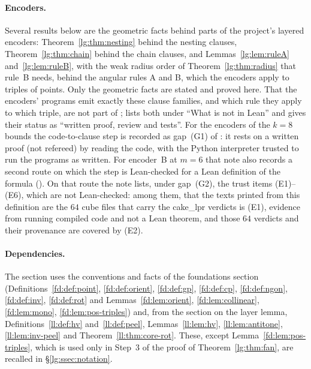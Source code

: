 \paragraph{Encoders.} Several results below are the geometric facts behind parts of the project's layered encoders:
Theorem~\ref{lg:thm:nesting} behind the nesting clauses, Theorem~\ref{lg:thm:chain} behind the chain clauses, and
Lemmas~\ref{lg:lem:ruleA} and~\ref{lg:lem:ruleB}, with the weak radius order of Theorem~\ref{lg:thm:radius} that
rule~B needs, behind the angular rules A and B, which the encoders apply to triples of points. Only the geometric
facts are stated and proved here. That the
encoders' programs emit exactly these clause families, and which rule they apply to which triple, are not part of
;  lists both under ``What is not in Lean'' and gives their
status as ``written proof, review and tests''. For the encoders of the $k=8$ bounds the code-to-clause step is
recorded as gap~(G1) of : it rests on a written proof (not refereed) by reading
the code, with the Python interpreter trusted to run the programs as written. For encoder~B at $m=6$ that note also
records a second route on which the step is Lean-checked for a Lean definition of the formula (). On
that route the note lists, under gap~(G2), the trust items (E1)--(E6), which are not Lean-checked: among them, that the
texts printed from this definition are the $64$ cube files that carry the cake\_lpr verdicts is (E1), evidence from
running compiled code and not a Lean theorem, and those $64$ verdicts and their provenance are covered by (E2).

\paragraph{Dependencies.} The section uses the conventions and facts of the foundations section
(Definitions~\ref{fd:def:point}, \ref{fd:def:orient}, \ref{fd:def:gp}, \ref{fd:def:cp}, \ref{fd:def:ngon},
\ref{fd:def:inv}, \ref{fd:def:rot} and Lemmas~\ref{fd:lem:orient}, \ref{fd:lem:collinear}, \ref{fd:lem:mono},
\ref{fd:lem:pos-triples}) and, from the section on the layer lemma, Definitions~\ref{ll:def:hv} and~\ref{ll:def:peel},
Lemmas~\ref{ll:lem:hv}, \ref{ll:lem:antitone}, \ref{ll:lem:inv-peel} and Theorem~\ref{ll:thm:core-rot}. These,
except Lemma~\ref{fd:lem:pos-triples}, which is used only in Step~3 of the proof of Theorem~\ref{lg:thm:fan}, are
recalled in \S\ref{lg:ssec:notation}.

